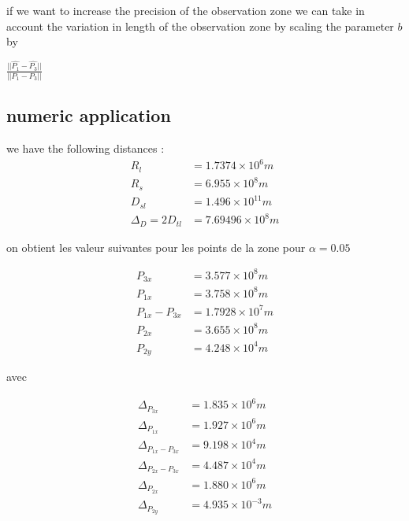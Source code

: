 \documentclass{article} %
\begin{document}
		
		
		if we want to increase the precision of the observation zone we can take in account the variation in length of the observation zone by scaling the parameter $b$ by 
		
		
		$\frac{||\hat{P_1}-\hat{P_3}||}{||P_1-P_3||}$		
		\subsection{numeric application}
		we have the following distances : 
		$$
		\begin{align}
			R_l&=1.7374\times10^6 m \\
			R_s&=6.955\times10^8 m \\ 
			D_{sl}&=1.496\times10^{11} m \\
			\Delta_D=2D_{tl}&= 7.69496\times10^8 m
		\end{align}
		$$
		
		on obtient les valeur suivantes pour les points de la zone pour $\alpha=0.05$
		
		$$
		\begin{align}
			P_{3x}&=3.577\times10^8 m \\
			P_{1x}&=3.758\times10^8 m \\ 
			P_{1x}-P_{3x}&=1.7928\times10^7 m \\ 
			P_{2x}&=3.655\times10^8 m \\
			P_{2y}&= 4.248\times10^4 m
		\end{align}
		$$
		
		avec
		
		$$
		\begin{align}
			\Delta_{P_{3x}}&=1.835\times10^6 m \\
			\Delta_{P_{1x}}&=1.927\times10^6 m \\ 
			\Delta_{P_{1x}-P_{3x}}&=9.198\times10^4 m \\ 
			\Delta_{P_{2x}-P_{3x}}&=4.487\times10^4 m \\ 
			\Delta_{P_{2x}}&=1.880\times10^6 m \\
			\Delta_{P_{2y}}&= 4.935\times10^{-3} m
		\end{align}
		$$
		
\end{document}
